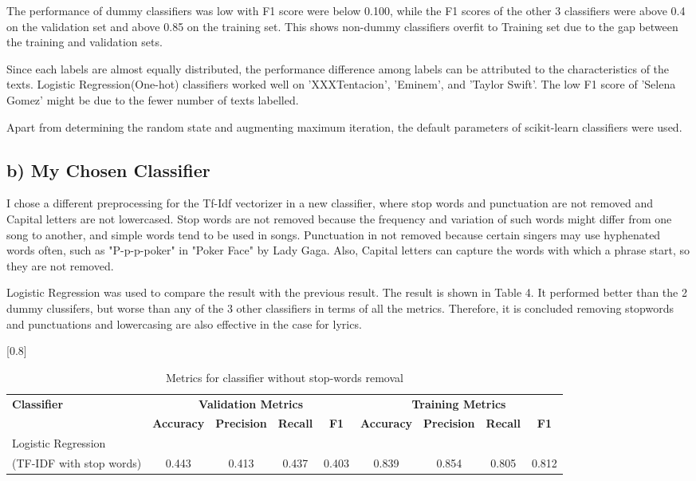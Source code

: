 \documentclass[a4paper,11pt]{article}
\begin{document}
The performance of dummy classifiers was low with F1 score were below 0.100,
while the F1 scores of the other 3 classifiers were above 0.4 on the validation set
and above 0.85 on the training set.
This shows non-dummy classifiers overfit to Training set due to the gap between the training and validation sets.

Since each labels are almost equally distributed, the performance difference among labels can be attributed to the characteristics of the texts.
Logistic Regression(One-hot) classifiers worked well on 'XXXTentacion', 'Eminem', and 'Taylor Swift'.
The low F1 score of 'Selena Gomez' might be due to the fewer number of texts labelled.

Apart from determining the random state and augmenting maximum iteration, the default parameters of scikit-learn classifiers were used.


\subsection{b) My Chosen Classifier}
I chose a different preprocessing for the Tf-Idf vectorizer in a new classifier, where stop words and punctuation are not removed and Capital letters are not lowercased.
Stop words are not removed because the frequency and variation of such words might differ from one song to another, and simple words tend to be used in songs.
Punctuation in not removed because certain singers may use hyphenated words often, such as "P-p-p-poker" in "Poker Face" by Lady Gaga. 
Also, Capital letters can capture the words with which a phrase start, so they are not removed.

Logistic Regression was used to compare the result with the previous result.
The result is shown in Table 4.
It performed better than the 2 dummy clussifers, but worse than any of the 3 other classifiers in terms of all the metrics.
Therefore, it is concluded removing stopwords and punctuations and lowercasing are also effective in the case for lyrics.




\begin{table}[htbp]
    \centering
    \caption{Metrics for classifier without stop-words removal}
    \small
    \scalebox{0.8}[0.8]{
    \begin{tabular}{l|cccc|cccc}
        \hline
        \textbf{Classifier} & \multicolumn{4}{c|}{\textbf{Validation Metrics}} & \multicolumn{4}{c}{\textbf{Training Metrics}} \\
        & \textbf{Accuracy} & \textbf{Precision} & \textbf{Recall} & \textbf{F1} & \textbf{Accuracy} & \textbf{Precision} & \textbf{Recall} & \textbf{F1} \\
        \hline 
        Logistic Regression &&&&&& \\ (TF-IDF with stop words) & 0.443 & 0.413 & 0.437 & 0.403 & 0.839 & 0.854 & 0.805 & 0.812 \\
        \hline
    \end{tabular}
    }
\end{table}
\end{document}
